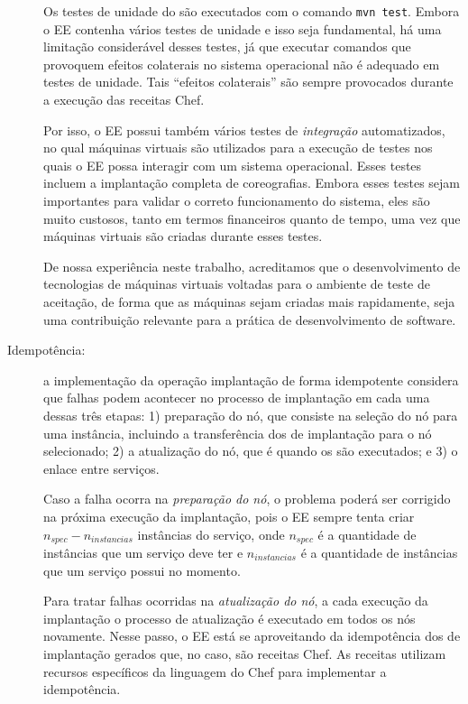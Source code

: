 \begin{description}
Os testes de unidade do \ee são executados com o comando \texttt{mvn test}.
Embora o EE contenha vários testes de unidade e isso seja fundamental,
há uma limitação considerável desses testes, já que executar comandos que
provoquem efeitos colaterais no sistema operacional não é adequado
em testes de unidade. Tais ``efeitos colaterais'' são sempre provocados
durante a execução das receitas Chef.

Por isso, o EE possui também vários testes de \emph{integração} automatizados,
no qual máquinas virtuais são utilizados para a execução de testes nos
quais o EE possa interagir com um sistema operacional.
Esses testes incluem a implantação completa de coreografias.
Embora esses testes sejam importantes para validar o correto funcionamento do sistema,
eles são muito custosos, tanto em termos financeiros quanto de tempo,
uma vez que máquinas virtuais são criadas durante esses testes.

De nossa experiência neste trabalho, acreditamos que
o desenvolvimento de tecnologias de máquinas virtuais
voltadas para o ambiente de teste de aceitação,
de forma que as máquinas sejam criadas mais rapidamente,
seja uma contribuição relevante para a prática de desenvolvimento de software.

\item [Idempotência:] a implementação da operação implantação de forma idempotente considera
que falhas podem acontecer no processo de implantação em cada uma dessas três etapas: 
1) preparação do nó, que consiste na seleção do nó para uma instância, 
incluindo a transferência dos \scripts de implantação para o nó selecionado;
2) a atualização do nó, que é quando os \scripts são executados;
e 3) o enlace entre serviços.

Caso a falha ocorra na \emph{preparação do nó},
o problema poderá ser corrigido na próxima execução da implantação,
pois o EE sempre tenta criar $n_{spec} - n_{instancias}$ instâncias do serviço, 
onde $n_{spec}$ é a quantidade de instâncias que um serviço deve ter
e $n_{instancias}$ é a quantidade de instâncias que um serviço possui no momento.

Para tratar falhas ocorridas na \emph{atualização do nó},
a cada execução da implantação o processo de atualização
é executado em todos os nós novamente.
Nesse passo, o EE está se aproveitando da idempotência dos \scripts
de implantação gerados que, no caso, são receitas Chef.
As receitas utilizam recursos específicos da linguagem do Chef para implementar a idempotência.


\end{description}

